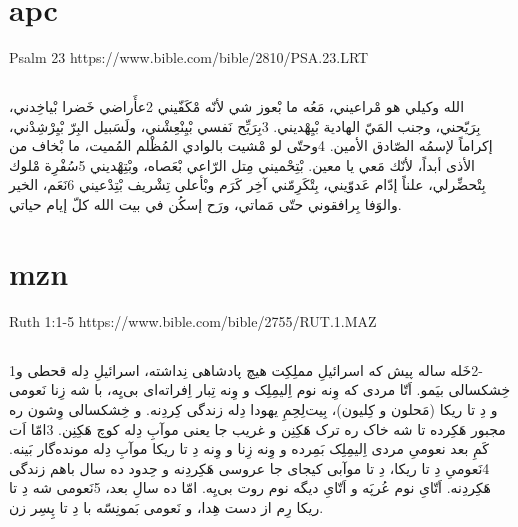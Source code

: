 \documentclass[12pt,fleqn,titlepage,twoside,a4paper]{book}
\begin{document}
\section{apc}

Psalm 23 https://www.bible.com/bible/2810/PSA.23.LRT

\begin{arab}[utf]
\section*{}

الله وكيلي هو مْراعيني،
مَعُه ما بْعوز شي لأنّه مْكَفّيني
2عأَراضي خَضرا بْياخِدني، بِرَيّحني،
وجنب المَيّ الهادية بْيِهْديني.
3بِرَيِّح نَفسي بْيِنْعِشْني،
ولَسَبيل البِرّ بْيِرْشِدْني،
إكراماً لإسمُه الصّادق الأمين.
4وحتّى لو مْشيت بالوادي المُظْلم المُميت،
ما بْخاف من الأذى أبداً، لأنّك مَعي يا معين.
بْتِحْميني مِتل الرّاعي بْعَصاه، وبْتِهْديني
5سُفْرِة مْلوك بِتْحضِّرلي، علناً إدّام عَدوّيني،
بِتْكَرِمّني آخِر كَرَم وبْأعلى تِشْريف بْتِدْعيني
6نَعَم، الخير والوَفا بِرافقوني حتّى مَماتي،
ورَح إسكُن في بيت الله كلّ إيام حياتي.

\end{arab}


\section{mzn}

Ruth 1:1-5  https://www.bible.com/bible/2755/RUT.1.MAZ

\begin{arab}[utf]
\section*{}

1‏-2خَله ساله پیش که اسرائیلِ مملِکِت هیچ پادشاهی نِداشته، اسرائیلِ دِله قحطی و خِشکسالی بیَمو. اَتّا مردی که وِنه نوم اِلیمِلِک و وِنه تِبار اِفراته‌ای بی‌یِه، با شه زِنا نَعومی و دِ تا ریکا (مَحلون و کِلیون)، بِیت‌لِحِمِ یهودا دِله زندگی کِردِنه. و خِشکسالی وِشون ره مجبور هَکِرده تا شه خاک ره ترک هَکِنِن و غریب جا یعنی موآبِ دِله کوچ هَکِنِن. 3امّا اَت کَمِ بعد نعومیِ مردی اِلیمِلِک بَمِرده و وِنه زِنا و وِنه دِ تا ریکا موآبِ دِله مونده‌گار بَینه. 4نَعومیِ دِ تا ریکا، دِ تا موآبی کیجای جا عروسی هَکِردِنه و حِدود ده سال باهم زندگی هَکِردِنه. اَتّایِ نوم عُرپَه و اَتّایِ دیگه نوم روت بی‌یِه. امّا ده سالِ بعد، 5نَعومی شه دِ تا ریکا رِم از دست هِدا، و نَعومی بَمونِسّه با دِ تا پِسِر زن.

\end{arab}
\end{document}
